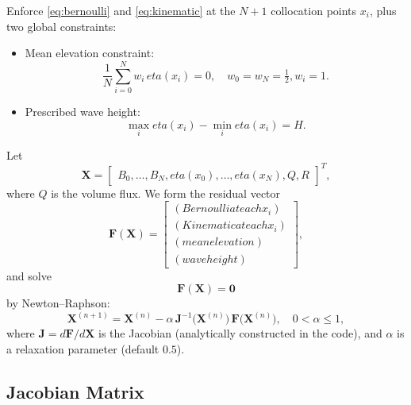 \documentclass[journal,10pt,twocolumn]{IEEEtran}
\def\eta{eta}%
\def\partial{d}%
\def\text#1{#1}%
\def\;{ }%
\begin{document}
    Enforce \eqref{eq:bernoulli} and \eqref{eq:kinematic} at the $N+1$ collocation points $x_i$, plus two global constraints:
    \begin{itemize}[leftmargin=1.4em]
        \item Mean elevation constraint:
        \[
            \frac{1}{N}\sum_{i=0}^N w_i\,\eta(x_i)=0,\quad
            w_0=w_N=\tfrac12,\;w_i=1.
        \]
        \item Prescribed wave height:
        \[
            \max_i\eta(x_i)-\min_i\eta(x_i)=H.
        \]
    \end{itemize}
    Let
    \[
        \mathbf{X} =
        \begin{bmatrix}
            B_0,\dots,B_N,\;
            \eta(x_0),\dots,\eta(x_N),\;
            Q,\;R
        \end{bmatrix}^{T},
    \]
    where $Q$ is the volume flux. We form the residual vector
    \[
        \mathbf{F}(\mathbf{X}) =
        \begin{bmatrix}
            \text{(Bernoulli at each }x_i)\\
            \text{(Kinematic at each }x_i)\\
            \text{(mean elevation)}\\
            \text{(wave height)}
        \end{bmatrix},
    \]
    and solve
    \[
        \mathbf{F}(\mathbf{X}) = \mathbf{0}
    \]
    by Newton--Raphson:
    \begin{equation}
        \mathbf{X}^{(n+1)}
        = \mathbf{X}^{(n)}
        - \alpha\,
        \mathbf{J}^{-1}\!\bigl(\mathbf{X}^{(n)}\bigr)\,
        \mathbf{F}\bigl(\mathbf{X}^{(n)}\bigr),
        \quad 0<\alpha\le1,
    \end{equation}
    where $\mathbf{J} = \partial\mathbf{F}/\partial\mathbf{X}$ is the Jacobian (analytically constructed in the code), and $\alpha$ is a relaxation parameter (default $0.5$).

    \subsection{Jacobian Matrix}
    \label{sec:jacobian}
\end{document}
